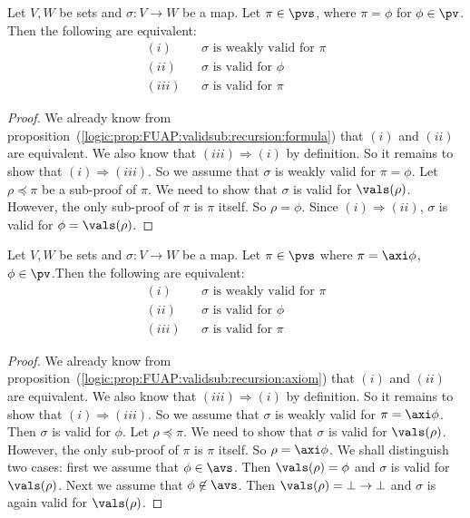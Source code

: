 \begin{prop}\label{logic:prop:FUAP:strongvalidsub:recursion:formula}
Let $V, W$ be sets and $\sigma:V\to W$ be a map. Let $\pi\in\pvs$,
where $\pi=\phi$ for $\phi\in\pv$. Then the following are
equivalent:
    \begin{eqnarray*}
    (i)&&\mbox{$\sigma$ is weakly valid for $\pi$}\\
    (ii)&&\mbox{$\sigma$ is valid for $\phi$}\\
    (iii)&&\mbox{$\sigma$ is valid for $\pi$}
    \end{eqnarray*}
\end{prop}
\begin{proof}
We already know from
proposition~(\ref{logic:prop:FUAP:validsub:recursion:formula}) that
$(i)$ and $(ii)$ are equivalent. We also know that $(iii)\Rightarrow
(i)$ by definition. So it remains to show that
$(i)\Rightarrow(iii)$. So we assume that $\sigma$ is weakly valid
for $\pi=\phi$. Let $\rho\preceq\pi$ be a sub-proof of $\pi$. We
need to show that $\sigma$ is valid for $\vals(\rho)$. However, the
only sub-proof of $\pi$ is $\pi$ itself. So $\rho=\phi$. Since
$(i)\Rightarrow(ii)$,  $\sigma$ is valid for $\phi=\vals(\rho)$.
\end{proof}


\begin{prop}\label{logic:prop:FUAP:strongvalidsub:recursion:axiom}
Let $V, W$ be sets and $\sigma:V\to W$ be a map. Let $\pi\in\pvs$
where $\pi=\axi\phi$, $\phi\in\pv$.Then the following are
equivalent:
    \begin{eqnarray*}
    (i)&&\mbox{$\sigma$ is weakly valid for $\pi$}\\
    (ii)&&\mbox{$\sigma$ is valid for $\phi$}\\
    (iii)&&\mbox{$\sigma$ is valid for $\pi$}
    \end{eqnarray*}
\end{prop}
\begin{proof}
We already know from
proposition~(\ref{logic:prop:FUAP:validsub:recursion:axiom}) that
$(i)$ and $(ii)$ are equivalent. We also know that $(iii)\Rightarrow
(i)$ by definition. So it remains to show that
$(i)\Rightarrow(iii)$. So we assume that $\sigma$ is weakly valid
for $\pi=\axi\phi$. Then $\sigma$ is valid for $\phi$. Let
$\rho\preceq\pi$. We need to show that $\sigma$ is valid for
$\vals(\rho)$. However, the only sub-proof of $\pi$ is $\pi$ itself.
So $\rho=\axi\phi$. We shall distinguish two cases: first we assume
that $\phi\in\avs$. Then $\vals(\rho)=\phi$ and $\sigma$ is valid
for $\vals(\rho)$. Next we assume that $\phi\not\in\avs$. Then
$\vals(\rho)=\bot\to\bot$ and $\sigma$ is again valid for
$\vals(\rho)$.
\end{proof}



